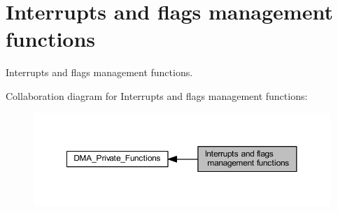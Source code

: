 \hypertarget{group___d_m_a___group4}{}\section{Interrupts and flags management functions}
\label{group___d_m_a___group4}


Interrupts and flags management functions.  


Collaboration diagram for Interrupts and flags management functions\+:\nopagebreak
\begin{figure}[H]
\begin{center}
\leavevmode
\includegraphics[width=350pt]{group___d_m_a___group4}
\end{center}
\end{figure}
